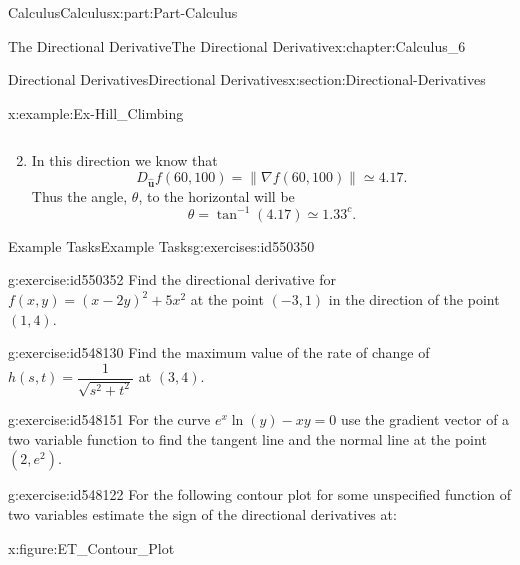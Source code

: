 \documentclass[oneside,10pt,]{book}
\numberwithin{equation}{section}
\newcommand{\bm}[1]{\boldsymbol{#1}}
\begin{document}
\begin{partptx}{Calculus}{}{Calculus}{}{}{x:part:Part-Calculus}
\begin{chapterptx}{The Directional Derivative}{}{The Directional Derivative}{}{}{x:chapter:Calculus_6}
\begin{sectionptx}{Directional Derivatives}{}{Directional Derivatives}{}{}{x:section:Directional-Derivatives}
\begin{example}{}{x:example:Ex-Hill_Climbing}
\begin{enumerate}[label=\alph*]
\begin{equation*}
\end{equation*}
%
\item{}In this direction we know that%
\begin{equation*}
D_{\hat{\bm{u}}} f(60,100) = \| \nabla f(60,100) \| \simeq 4.17\text{.}
\end{equation*}
Thus the angle, \(\theta\), to the horizontal will be%
\begin{equation*}
\theta = \tan^{-1} (4.17) \simeq 1.33^{c}\text{.}
\end{equation*}
%
\end{enumerate}
%
\end{example}
%
%
\typeout{************************************************}
\typeout{************************************************}
%
\begin{exercises-subsection-numberless}{Example Tasks}{}{Example Tasks}{}{}{g:exercises:id550350}
\begin{divisionexercise}{1}{}{}{g:exercise:id550352}%
Find the directional derivative for \(f(x,y) = (x-2y)^2 + 5x^2\) at the point \((-3,1)\) in the direction of the point \((1,4)\).%
\end{divisionexercise}%
\begin{divisionexercise}{2}{}{}{g:exercise:id548130}%
Find the maximum value of the rate of change of \(h(s,t) = \dfrac{1}{\sqrt{s^2+t^2}}\) at \((3,4)\).%
\end{divisionexercise}%
\begin{divisionexercise}{3}{}{}{g:exercise:id548151}%
For the curve \(e^x \ln (y) - xy = 0\) use the gradient vector of a two variable function to find the tangent line and the normal line at the point \((2,e^2)\).%
\end{divisionexercise}%
\begin{divisionexercise}{4}{}{}{g:exercise:id548122}%
For the following contour plot for some unspecified function of two variables estimate the sign of the directional derivatives at:%
\begin{figureptx}{}{x:figure:ET_Contour_Plot}{}%
\begin{image}{0.15}{0.7}{0.15}%

\end{image}
\end{figureptx}
\end{divisionexercise}
\end{exercises-subsection-numberless}
\end{sectionptx}
\end{chapterptx}
\end{partptx}
\end{document}
